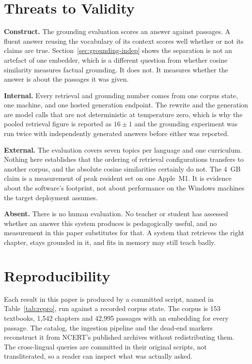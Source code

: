 \section{Threats to Validity}
\label{sec:threats}

\textbf{Construct.} The grounding evaluation scores an answer against passages. A fluent answer reusing the vocabulary of its context scores well whether or not its claims are true. Section~\ref{sec:grounding-indep} shows the separation is not an artefact of one embedder, which is a different question from whether cosine similarity measures factual grounding. It does not. It measures whether the answer is about the passages it was given.

\textbf{Internal.} Every retrieval and grounding number comes from one corpus state, one machine, and one hosted generation endpoint. The rewrite and the generation are model calls that are not deterministic at temperature zero, which is why the pooled retrieval figure is reported as $16\pm1$ and the grounding experiment was run twice with independently generated answers before either was reported.

\textbf{External.} The evaluation covers seven topics per language and one curriculum. Nothing here establishes that the ordering of retrieval configurations transfers to another corpus, and the absolute cosine similarities certainly do not. The 4~GB claim is a measurement of peak resident set on one Apple~M1. It is evidence about the software's footprint, not about performance on the Windows machines the target deployment assumes.

\textbf{Absent.} There is no human evaluation. No teacher or student has assessed whether an answer this system produces is pedagogically useful, and no measurement in this paper substitutes for that. A system that retrieves the right chapter, stays grounded in it, and fits in memory may still teach badly.

\section{Reproducibility}
\label{sec:repro}

Each result in this paper is produced by a committed script, named in Table~\ref{tab:repro}, run against a recorded corpus state. The corpus is 153 textbooks, 1{,}542 chapters and 42{,}995 passages with an embedding for every passage. The catalog, the ingestion pipeline and the dead-end markers reconstruct it from NCERT's published archives without redistributing them. The cross-lingual queries are committed in their original scripts, not transliterated, so a reader can inspect what was actually asked.

